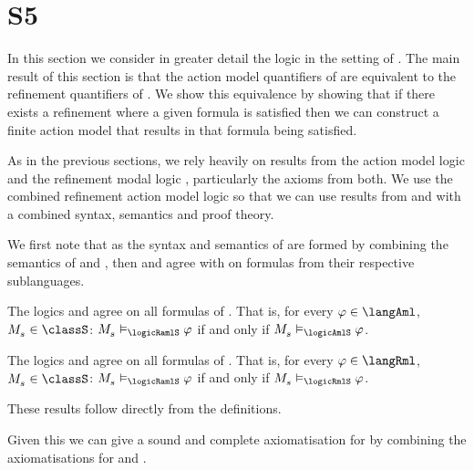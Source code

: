 \section{S5}\label{aaml-s5}

In this section we consider in greater detail the logic \logicAamlS{} in the setting of \classS{}.
The main result of this section is that the action model quantifiers of \logicAamlS{} are equivalent to the refinement quantifiers of \logicRmlS{}.
We show this equivalence by showing that if there exists a refinement where a given formula is satisfied then we can construct a finite action model that results in that formula being satisfied.

As in the previous sections, we rely heavily on results from the action model logic \logicAmlS{} and the refinement modal logic \logicRmlS{}, particularly the axioms from both.
We use the combined refinement action model logic \logicRamlS{} so that we can use results from \logicAmlS{} and \logicRmlS{} with a combined syntax, semantics and proof theory.

We first note that as the syntax and semantics of \logicRamlS{} are formed by combining the semantics of \logicAmlS{} and \logicRmlS{}, then \logicAmlS{} and \logicRmlS{} agree with \logicRamlS{} on formulas from their respective sublanguages.

\begin{lemma}\label{raml-s5-aml}
The logics \logicRamlS{} and \logicAmlS{} agree on all formulas of \langAml{}.
That is, for every $\phi \in \langAml$, $\kPModel{\kStateS} \in \classS$: $\kPModel{\kStateS} \entails_\logicRamlS \phi$ if and only if $\kPModel{\kStateS} \entails_\logicAmlS \phi$.
\end{lemma}

\begin{lemma}\label{raml-s5-rml}
The logics \logicRamlS{} and \logicAmlS{} agree on all formulas of \langRml{}.
That is, for every $\phi \in \langRml$, $\kPModel{\kStateS} \in \classS$: $\kPModel{\kStateS} \entails_\logicRamlS \phi$ if and only if $\kPModel{\kStateS} \entails_\logicRmlS \phi$.
\end{lemma}

These results follow directly from the definitions.

Given this we can give a sound and complete axiomatisation for \logicRamlS{} by combining the axiomatisations for \logicAmlS{} and \logicRmlS{}.

